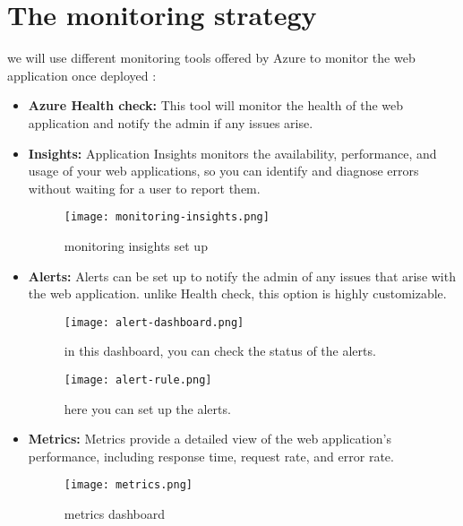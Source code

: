 \section{The monitoring strategy}
we will use different monitoring tools offered by Azure to monitor the web application once deployed \cite{monitorAzureAppService}:
\begin{itemize}
    \item \textbf{Azure Health check:} This tool will monitor the health of the web application and notify the admin if any issues arise.
    \item \textbf{Insights:} Application Insights monitors the availability, performance, and usage of your web applications, so you can identify and diagnose errors without waiting for a user to report them.

          \begin{figure}[H]
              \centering
              \texttt{[image: monitoring-insights.png]}
              \caption{monitoring insights set up}
              \label{fig:monitoring-insights}
          \end{figure}

    \item \textbf{Alerts:} Alerts can be set up to notify the admin of any issues that arise with the web application. unlike Health check, this option is highly customizable.

          \begin{figure}[H]
              \centering
              \texttt{[image: alert-dashboard.png]}
              \caption{in this dashboard, you can check the status of the alerts.}
              \label{fig:monitoring-alerts}
          \end{figure}

          \begin{figure}[H]
              \centering
              \texttt{[image: alert-rule.png]}
              \caption{here you can set up the alerts.}
              \label{fig:monitoring-set-up-alerts}
          \end{figure}

    \item \textbf{Metrics:} Metrics provide a detailed view of the web application's performance, including response time, request rate, and error rate.

          \begin{figure}[H]
              \centering
              \texttt{[image: metrics.png]}
              \caption{metrics dashboard}
              \label{fig:monitoring-metrics}
          \end{figure}


\end{itemize}

